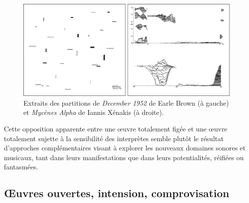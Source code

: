 \begin{figure}[!htbp]
	\captionsetup{format=plain}
	\includegraphics[width=\textwidth]{gfx/notation/Brown-Xenakis-Paysage.png}
	\caption[Partitions de \textit{December 1952} et \textit{Mycènes Alpha} (extraits)]{Extraits des partitions de \textit{December 1952} de Earle Brown (à gauche) et \textit{Mycènes Alpha} de Iannis Xénakis (à droite).}
	\label{fig:notation:brown-xenakis}
\end{figure}

\noindent Cette opposition apparente entre une œuvre totalement figée et une œuvre totalement sujette à la sensibilité des interprètes semble plutôt le résultat d'approches complémentaires visant à explorer les nouveaux domaines sonores et musicaux, tant dans leurs manifestations que dans leurs potentialités, réifiées ou fantasmées.

\subsection{Œuvres ouvertes, intension, comprovisation}

